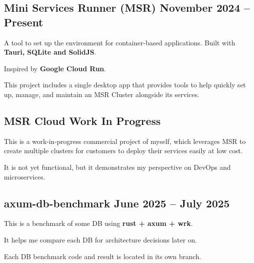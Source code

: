 \subsection{{Mini Services Runner (MSR) \hfill November 2024 -- Present}}
\begin{zitemize}
\item A tool to set up the environment for container-based applications. Built with \textbf{Tauri, SQLite and SolidJS}.
\item Inspired by \textbf{Google Cloud Run}. 
\item This project includes a single desktop app that provides tools to help quickly set up, manage, and maintain an MSR Cluster alongside its services.

\end{zitemize}

\subsection{{MSR Cloud \hfill  Work In Progress}}
\begin{zitemize}
\item This is a work-in-progress commercial project of myself, which leverages MSR to create multiple clusters for customers to deploy their services easily at low cost.
\item It is not yet functional, but it demonstrates my perspective on DevOps and microservices.

\end{zitemize}

\subsection{{axum-db-benchmark \hfill June 2025 -- July 2025}}
\begin{zitemize}
\item This is a benchmark of some DB using \textbf{rust + axum + wrk}.
\item It helps me compare each DB for architecture decisions later on.
\item Each DB benchmark code and result is located in its own branch.

\end{zitemize}



